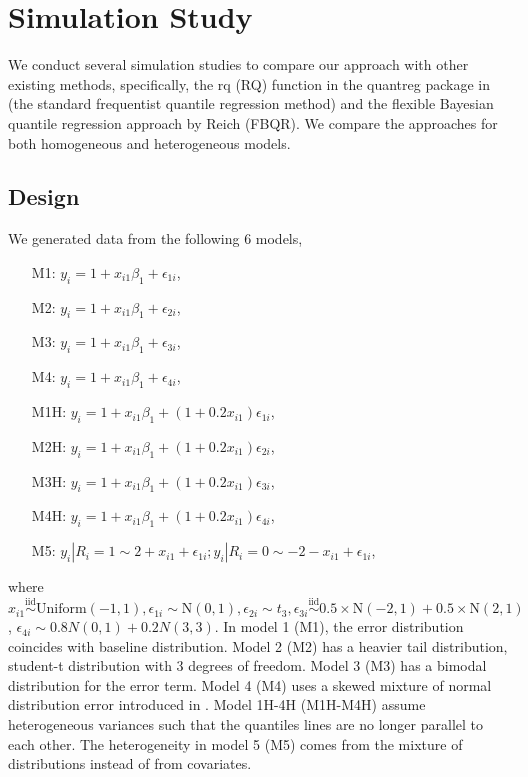 \documentclass[12pt]{article}
\begin{document}
\section{Simulation Study}
\label{ch2:sec:simulations}
We conduct several simulation studies to compare our approach with
other existing methods, specifically, the rq (RQ) function in the
quantreg package \citep{quantreg} in \cite{R} (the standard
frequentist quantile regression method) and the flexible Bayesian
quantile regression approach by Reich (FBQR).  We compare the
approaches for both homogeneous and heterogeneous models.

\subsection{Design}
We generated data from the following 6 models,
\begin{itemize}
\item [M1:] $y_i = 1 + x_{i1}\beta_1 + \epsilon_{1i}$,
\item [M2:] $y_i = 1 + x_{i1}\beta_1 + \epsilon_{2i}$,
\item [M3:] $y_i = 1 + x_{i1}\beta_1 + \epsilon_{3i}$,
\item [M4:] $y_i = 1 + x_{i1}\beta_1 + \epsilon_{4i}$,
\item [M1H:] $y_i = 1 + x_{i1}\beta_1 + (1 + 0.2x_{i1})
  \epsilon_{1i}$,
\item [M2H:] $y_i = 1 + x_{i1}\beta_1 + (1 + 0.2x_{i1})
  \epsilon_{2i}$,
\item [M3H:] $y_i = 1 + x_{i1}\beta_1 + (1 + 0.2x_{i1})
  \epsilon_{3i}$,
\item [M4H:] $y_i = 1 + x_{i1}\beta_1 + (1 + 0.2x_{i1})
  \epsilon_{4i}$,
\item [M5:] $y_{i} | R_i = 1 \sim 2 + x_{i1} + \epsilon_{1i}; y_{i}|
  R_i = 0 \sim -2 - x_{i1} + \epsilon_{1i}$,
\end{itemize}
where $x_{i1} \stackrel{\mbox{iid}}{\sim} \mathrm{Uniform}(-1,1), \epsilon_{1i} \sim \mathrm{N}(0,1), \epsilon_{2i} \sim t_3, \epsilon_{3i} \stackrel{\mbox{iid}}{\sim} 0.5 \times \mathrm{N}(-2,1) + 0.5 \times \mathrm{N}(2,1)$, $\epsilon_{4i} \sim 0.8 N(0,1) + 0.2 N(3,3)$.
In model 1 (M1), the error distribution coincides with baseline distribution.
Model 2 (M2) has a heavier tail distribution, student-t distribution with 3 degrees of freedom.
Model 3 (M3) has a bimodal distribution for the error term.
Model 4 (M4) uses a skewed mixture of normal distribution error introduced in \citet{reich2010}.
Model 1H-4H (M1H-M4H) assume heterogeneous variances such that the quantiles lines are no longer parallel to each other.
The heterogeneity in model 5 (M5) comes from the mixture of distributions instead of from covariates.
\end{document}
